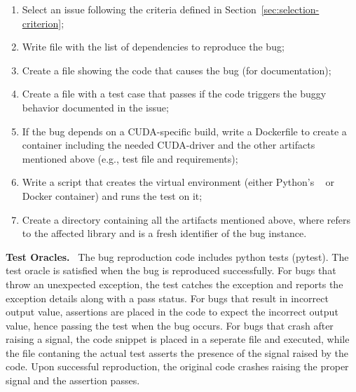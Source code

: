 \documentclass[sigconf,screen]{acmart}
\begin{document}
\begin{enumerate}[leftmargin=0.5cm]
  \item Select an issue following the criteria defined in Section~\ref{sec:selection-criterion};
  \item Write file  with the list of dependencies to reproduce the bug; 
  \item Create a file showing the code that causes the bug (for documentation);
  \item Create a file with a  test case that passes if
    the code triggers the buggy behavior documented in the issue;
  \item If the bug depends on a CUDA-specific build, write a
    Dockerfile to create a container including the needed CUDA-driver
    and the other artifacts mentioned above (e.g., test file and
    requirements);
  \item Write a script that creates the virtual environment (either
    Python's ~\cite{venv} or Docker container) and runs
    the test on it;
  \item Create a directory  containing all the
    artifacts mentioned above, where  refers to the
    affected library and  is a fresh identifier of the
    bug instance.
\end{enumerate}

\textbf{Test Oracles.}~
The bug reproduction code includes python tests (pytest). The test
oracle is satisfied when the bug is reproduced successfully. For bugs
that throw an unexpected exception, the test catches the exception and
reports the exception details along with a pass status. For bugs that
result in incorrect output value, assertions are placed in the code to
expect the incorrect output value, hence passing the test when the bug
occurs. For bugs that crash after raising a signal, the code snippet
is placed in a seperate file and executed, while the file contaning
the actual test asserts the presence of the signal raised by the
code. Upon successful reproduction, the original code crashes raising
the proper signal and the assertion passes.
\end{document}
